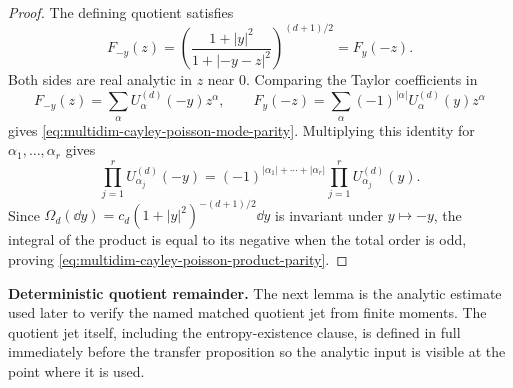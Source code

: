 \begin{proof}
The defining quotient satisfies
\[
F_{-y}(z)
=\left(\frac{1+|y|^2}{1+|-y-z|^2}\right)^{(d+1)/2}
=F_y(-z).
\]
Both sides are real analytic in \(z\) near \(0\).  Comparing the Taylor
coefficients in
\[
F_{-y}(z)=\sum_{\alpha}U_\alpha^{(d)}(-y)z^\alpha,
\qquad
F_y(-z)=\sum_{\alpha}(-1)^{|\alpha|}U_\alpha^{(d)}(y)z^\alpha
\]
gives \eqref{eq:multidim-cayley-poisson-mode-parity}.  Multiplying this
identity for \(\alpha_1,\ldots,\alpha_r\) gives
\[
\prod_{j=1}^r U_{\alpha_j}^{(d)}(-y)
=(-1)^{|\alpha_1|+\cdots+|\alpha_r|}
\prod_{j=1}^r U_{\alpha_j}^{(d)}(y).
\]
Since \(\Omega_d(\dd y)=c_d(1+|y|^2)^{-(d+1)/2}\dd y\) is invariant under
\(y\mapsto-y\), the integral of the product is equal to its negative when
the total order is odd, proving
\eqref{eq:multidim-cayley-poisson-product-parity}.
\end{proof}

\medskip
\noindent\textbf{Deterministic quotient remainder.}
The next lemma is the analytic estimate used later to verify the named
matched quotient jet from finite moments.  The quotient jet itself, including
the entropy-existence clause, is defined in full immediately before the
transfer proposition so the analytic input is visible at the point where it is
used.

